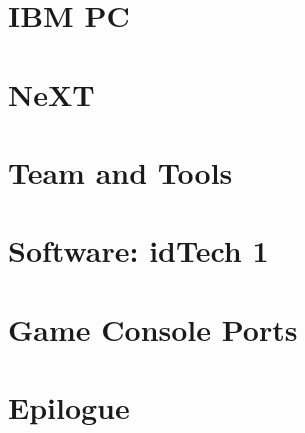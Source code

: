 \documentclass{book}
\begin{document}
   
      \chapter{IBM PC}
        
        
        
        
        
        
            

        


        
     \chapter{NeXT}
          


    

    \chapter{Team and Tools}
       
       
       
      
      
      
      
      




     \chapter{Software: idTech 1}
      
      
      
      
       
       
       
       
       
       
       
       
          
        
      

    \chapter{Game Console Ports}        
          

    \chapter*{Epilogue}
      
\end{document}
